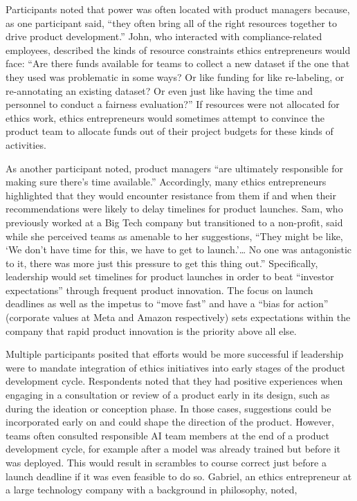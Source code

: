 \documentclass[sigconf]{acmart}
\begin{document}
Participants noted that power was often located with product managers because, as one participant said, “they often bring all of the right resources together to drive product development.”  John, who interacted with compliance-related employees, described the kinds of resource constraints ethics entrepreneurs would face: “Are there funds available for teams to collect a new dataset if the one that they used was problematic in some ways? Or like funding for like re-labeling, or re-annotating an existing dataset? Or even just like having the time and personnel to conduct a fairness evaluation?” If resources were not allocated for ethics work, ethics entrepreneurs would sometimes attempt to convince the product team to allocate funds out of their project budgets for these kinds of activities.

As another participant noted, product managers “are ultimately responsible for making sure there’s time available.” Accordingly, many ethics entrepreneurs highlighted that they would encounter resistance from them if and when their recommendations were likely to delay timelines for product launches. Sam, who previously worked at a Big Tech company but transitioned to a non-profit, said while she perceived teams as amenable to her suggestions, “They might be like, ‘We don’t have time for this, we have to get to launch.’… No one was antagonistic to it, there was more just this pressure to get this thing out.” Specifically, leadership would set timelines for product launches in order to beat “investor expectations” through frequent product innovation. The focus on launch deadlines as well as the impetus to “move fast” and have a “bias for action” (corporate values at Meta and Amazon respectively) sets expectations within the company that rapid product innovation is the priority above all else.

Multiple participants posited that efforts would be more successful if leadership were to mandate integration of ethics initiatives into early stages of the product development cycle. Respondents noted that they had positive experiences when engaging in a consultation or review of a product early in its design, such as during the ideation or conception phase. In those cases, suggestions could be incorporated early on and could shape the direction of the product. However, teams often consulted responsible AI team members at the end of a product development cycle, for example after a model was already trained but before it was deployed. This would result in scrambles to course correct just before a launch deadline if it was even feasible to do so. Gabriel, an ethics entrepreneur at a large technology company with a background in philosophy, noted,
\end{document}

